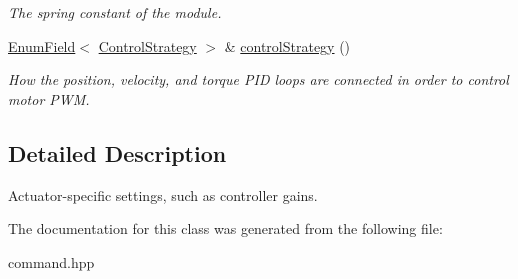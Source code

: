 \begin{DoxyCompactItemize}
\begin{DoxyCompactList}\small\item\em The spring constant of the module. \end{DoxyCompactList}\item 
\hyperlink{classhebi_1_1Command_1_1EnumField}{Enum\+Field}$<$ \hyperlink{classhebi_1_1Command_a0f4b41003c36dee21578caddb605c64a}{Control\+Strategy} $>$ \& \hyperlink{classhebi_1_1Command_1_1Settings_1_1Actuator_a7c08db380c5c7920255626de10bdca6d}{control\+Strategy} ()\hypertarget{classhebi_1_1Command_1_1Settings_1_1Actuator_a7c08db380c5c7920255626de10bdca6d}{}\label{classhebi_1_1Command_1_1Settings_1_1Actuator_a7c08db380c5c7920255626de10bdca6d}

\begin{DoxyCompactList}\small\item\em How the position, velocity, and torque P\+ID loops are connected in order to control motor P\+WM. \end{DoxyCompactList}\end{DoxyCompactItemize}


\subsection{Detailed Description}
Actuator-\/specific settings, such as controller gains. 

The documentation for this class was generated from the following file\+:\begin{DoxyCompactItemize}
\item 
command.\+hpp\end{DoxyCompactItemize}
